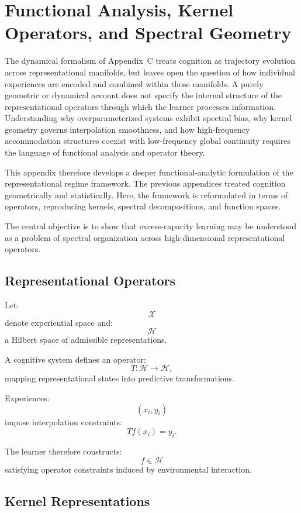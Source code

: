 \documentclass[12pt,a4paper]{article}
\begin{document}
\section{Functional Analysis, Kernel Operators, and Spectral Geometry}

The dynamical formalism of Appendix~C treats cognition as trajectory evolution across representational manifolds, but leaves open the question of how individual experiences are encoded and combined within those manifolds. A purely geometric or dynamical account does not specify the internal structure of the representational operators through which the learner processes information. Understanding why overparameterized systems exhibit spectral bias, why kernel geometry governs interpolation smoothness, and how high-frequency accommodation structures coexist with low-frequency global continuity requires the language of functional analysis and operator theory.

This appendix therefore develops a deeper functional-analytic formulation of the representational regime framework. The previous appendices treated cognition geometrically and statistically. Here, the framework is reformulated in terms of operators, reproducing kernels, spectral decompositions, and function spaces.

The central objective is to show that excess-capacity learning may be understood as a problem of spectral organization across high-dimensional representational operators.

\subsection{Representational Operators}

Let:
\[
\mathcal{X}
\]
denote experiential space and:
\[
\mathcal{H}
\]
a Hilbert space of admissible representations.

A cognitive system defines an operator:
\[
T :
\mathcal{H}
\rightarrow
\mathcal{H},
\]
mapping representational states into predictive transformations.

Experiences:
\[
(x_i,y_i)
\]
impose interpolation constraints:
\[
Tf(x_i)=y_i.
\]

The learner therefore constructs:
\[
f
\in
\mathcal{H}
\]
satisfying operator constraints induced by environmental interaction.

\subsection{Kernel Representations}
\end{document}
